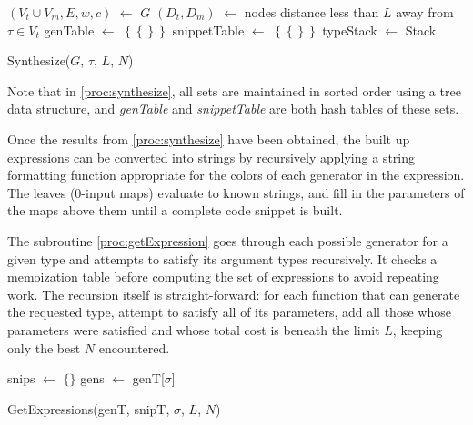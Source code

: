 \begin{procedure}
$(V_t\cup V_m, E, w, c)$ $\leftarrow$ $G$ \;
$(D_t, D_m)$ $\leftarrow$ nodes distance less than $L$ away from $\tau\in V_t$\;
genTable $\leftarrow$ $\left\{\left\{\right\}\right\}$ \;
snippetTable $\leftarrow$ $\left\{\left\{\right\}\right\}$ \;
typeStack $\leftarrow$ \KwNew Stack\;
\;
\caption{Synthesize($G$, $\tau$, $L$, $N$)}\label{proc:synthesize}
\end{procedure}

Note that in \ref{proc:synthesize}, all sets are maintained in sorted order using a tree data structure, and \textit{genTable} and \textit{snippetTable} are both hash tables of these sets.

Once the results from \ref{proc:synthesize} have been obtained, the built up expressions can be converted into strings by recursively applying a string formatting function appropriate for the colors of each generator in the expression. The leaves ($0$-input maps) evaluate to known strings, and fill in the parameters of the maps above them until a complete code snippet is built.

The subroutine \ref{proc:getExpression} goes through each possible generator for a given type and attempts to satisfy its argument types recursively. It checks a memoization table before computing the set of expressions to avoid repeating work. The recursion itself is straight-forward: for each function that can generate the requested type, attempt to satisfy all of its parameters, add all those whose parameters were satisfied and whose total cost is beneath the limit $L$, keeping only the best $N$ encountered.
\begin{procedure}
snips $\leftarrow$ $\{\}$ \; \label{proc:getExpression:snipInit}
gens $\leftarrow$ genT[$\sigma$] \;
\caption{GetExpressions(genT, snipT, $\sigma$, $L$, $N$)}\label{proc:getExpression}
\end{procedure}

